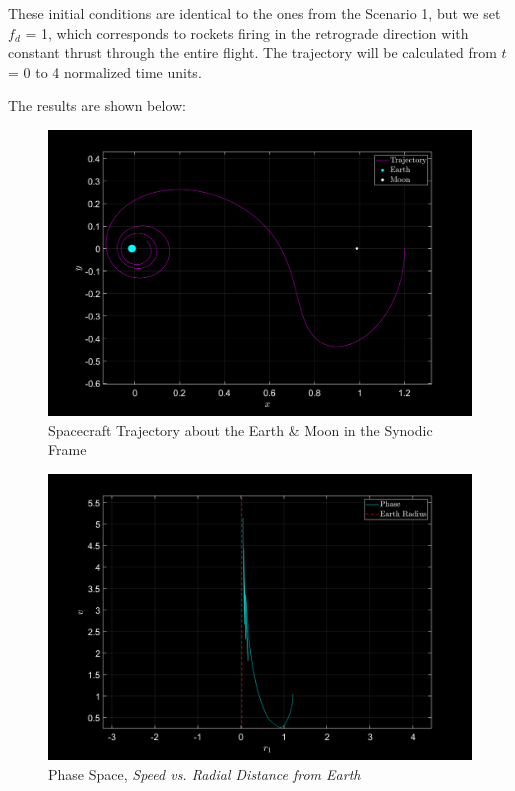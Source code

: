 These initial conditions are identical to the ones from the Scenario 1, but we set $f_d$ = 1, which corresponds to rockets firing in the retrograde direction with constant thrust through the entire flight. The trajectory will be calculated from $t$ = 0 to 4 normalized time units.

\vspace{\baselineskip}

The results are shown below:

\begin{figure}[h]
    \centering
    \includegraphics[width=\textwidth]{fig/trajectory2.png}
    \caption{Spacecraft Trajectory about the Earth \& Moon in the Synodic Frame}
    \label{fig3}
\end{figure}

\pagebreak

\begin{figure}[!h]
    \centering
    \includegraphics[width=\textwidth]{fig/phase2.png}
    \caption{Phase Space, \textit{Speed vs. Radial Distance from Earth}}
    \label{fig4}
\end{figure}


